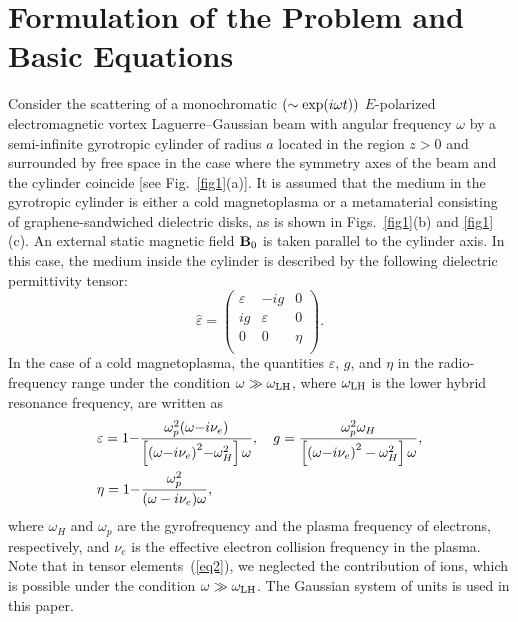 \documentclass[conference,a4paper]{IEEEtran}
\begin{document}
\section{Formulation of the Problem and Basic Equations}
Consider the scattering of a monochromatic $(\sim\exp(i\omega t))$ $E$-polarized electromagnetic vortex Laguerre--Gaussian beam with angular frequency $\omega$ by a semi-infinite gyrotropic cylinder of radius $a$ located in the region $z>0$ and surrounded by free space in the case where the symmetry axes of the beam and the cylinder coincide [see Fig.~\ref{fig1}(a)]. It is assumed that the medium in the gyrotropic cylinder is either a cold  magnetoplasma or a metamaterial consisting of graphene-sandwiched dielectric disks, as is shown in Figs.~\ref{fig1}(b) and \ref{fig1}(c). An external static magnetic field ${\bf B}_0$ is taken parallel to the cylinder axis. In this case, the medium inside the cylinder is described by the following dielectric permittivity tensor:
\begin{equation}\label{eq1}
{\hat \varepsilon} =
\left(\begin{array}{ccc}
\varepsilon & -i g& 0 \\
i g & \varepsilon & 0 \\
0 & 0 & \eta \\
\end{array} \right).
\end{equation}
In the case of a cold magnetoplasma, the quantities $\varepsilon$, $g$, and $\eta$ in the radio-frequency range under the condition $\omega\gg \omega_{\rm LH}$, where $\omega_{\rm LH}$ is the lower hybrid resonance frequency, are written as~\cite{Ginzburg1970}
\begin{align}\label{eq2}
&\varepsilon = 1 {-} \frac{{\omega_p^2(\omega {-} i\nu_{e} )}}{{\left[ {{{(\omega {-} {i}\nu_{e} )}^2} {-} \omega_{H}^2} \right]\omega }},\quad g = \frac{{\omega _p^2{\omega_{H}}}}{{\left[ {{{(\omega {-} i\nu_{e} )}^2} - \omega_{H}^2} \right]\omega }},\notag\\
&\eta= 1 {-} \frac{{\omega_p^2}}{{(\omega  - i\nu_{e} )\omega }},
\end{align}
where $\omega_{H}$ and $\omega_p$ are the  gyrofrequency and the plasma frequency of electrons, respectively, and $\nu_{e}$ is the effective electron collision frequency in the plasma. Note that in tensor elements~(\ref{eq2}), we neglected the contribution of ions, which is possible under the condition $\omega\gg\omega_{\rm LH}$.
The Gaussian system of units is used in this paper.
\end{document}
